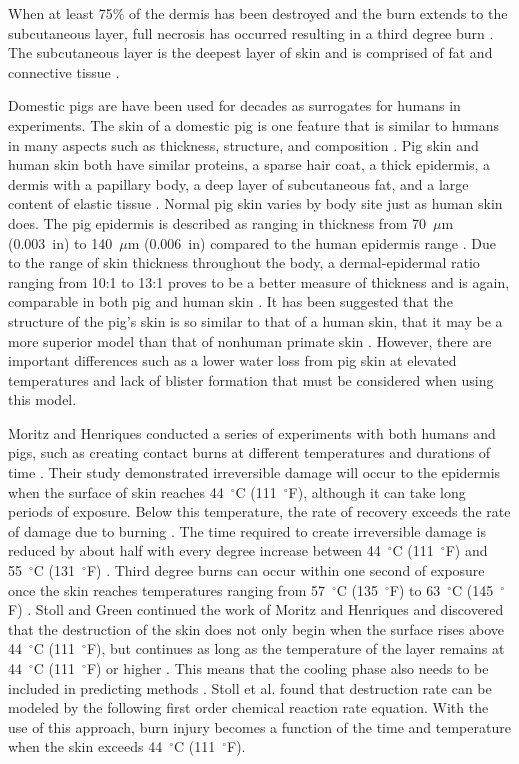 \documentclass[12pt,oneside]{book}
\begin{document}
When at least 75\% of the dermis has been destroyed and the burn extends to the subcutaneous layer, full necrosis has occurred resulting in a third degree burn \cite{Purser_Toxicity_Heat}. The subcutaneous layer is the deepest layer of skin and is comprised of fat and connective tissue \cite{Hummel_Barker_Lyons}.

Domestic pigs are have been used for decades as surrogates for humans in experiments. The skin of a domestic pig is one feature that is similar to humans in many aspects such as thickness, structure, and composition \cite{Time_Temperature_Cutaneous_Burns}. Pig skin and human skin both have similar proteins, a sparse hair coat, a thick epidermis, a dermis with a papillary body, a deep layer of subcutaneous fat, and a large content of elastic tissue \cite{Of_pigs_and_men}. Normal pig skin varies by body site just as human skin does. The pig epidermis is described as ranging in thickness from 70~$\mu$m (0.003~in) to 140~$\mu$m (0.006~in) compared to the human epidermis range \cite{Pig_Experimental_model}. Due to the range of skin thickness throughout the body, a dermal-epidermal ratio ranging from 10:1 to 13:1 proves to be a better measure of thickness and is again, comparable in both pig and human skin \cite{Pigs_Wound_Healing}.  It has been suggested that the structure of the pig's skin is so similar to that of a human skin, that it may be a more{} superior model than that of nonhuman primate skin \cite{Sensitivity_Cross-reacting}. However, there are important differences such as a lower water loss from pig skin at elevated temperatures and lack of blister formation that must be considered when using this model.

Moritz and Henriques conducted a series of experiments with both humans and pigs, such as creating contact burns at different temperatures and durations of time \cite{Time_Temperature_Cutaneous_Burns}. Their study demonstrated irreversible damage will occur to the epidermis when the surface of skin reaches 44~$^\circ$C (111~$^\circ$F), although it can take long periods of exposure. Below this temperature, the rate of recovery exceeds the rate of damage due to burning \cite{Thermal_Electronic}. The time required to create irreversible damage is reduced by about half with every degree increase between 44~$^\circ$C (111~$^\circ$F) and 55~$^\circ$C (131~$^\circ$F) \cite{Thermal_Electronic}. Third degree burns can occur within one second of exposure once the skin reaches temperatures ranging from 57~$^\circ$C (135~$^\circ$F) to 63~$^\circ$C (145~$^\circ$F) \cite{Thermal_Electronic}. Stoll and Green continued the work of Moritz and Henriques and discovered that the destruction of the skin does not only begin when the surface rises above 44~$^\circ$C (111~$^\circ$F), but continues as long as the temperature of the layer remains at 44~$^\circ$C (111~$^\circ$F) or higher \cite{Pain_Thermal_Radiation}. This means that the cooling phase also needs to be included in predicting methods \cite{Standard_Manikin}. Stoll et al. found that destruction rate can be modeled by the following first order chemical reaction rate equation.  With the use of this approach, burn injury becomes a function of the time and temperature when the skin exceeds 44~$^\circ$C (111~$^\circ$F). 
\end{document}
